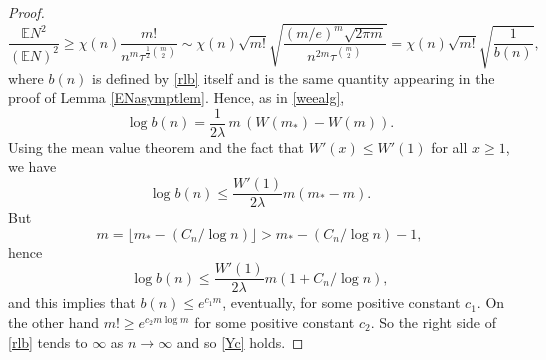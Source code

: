 \documentclass[reqno]{amsart}
\def\red{\color{red}}
\theoremstyle{theorem}
\theoremstyle{definition}
\theoremstyle{remark}
\newtheorem{remark}[theorem]{\bf\em Remark}
\def\E{\mathbb{E}}
\newcommand{\1}{{\text{\Large $\mathfrak 1$}}}	%
\newcommand{\var}{\operatorname{var}}
\numberwithin{equation}{section}
\def\Y{\mathbb{Y}}
\begin{document}
\begin{proof}
\begin{equation}
\frac{\E N^2}{(\E N)^2}  \ge \chi(n) \frac{m!}{n^m \tau^{\frac12\binom{m}{2}}}
\sim 
\chi(n) \sqrt{m!} \sqrt{\frac{(m/e)^m \sqrt{2\pi m}}{n^{2m}\tau^{\binom{m}{2}}}}
= \chi(n) \sqrt{m!} 
\sqrt{\frac{1}{b(n)}},
\end{equation}
where $b(n)$ is defined by \eqref{rlb} itself and is the same quantity
appearing in the proof of Lemma \ref{ENasymptlem}.
Hence, as in \eqref{weealg},
\[
\log b(n) = \frac{1}{2\lambda} \, m\, ( W(m_*) - W(m) ).
\]
Using the mean value theorem and the fact that $W'(x) \le W'(1)$ for
all $x \ge 1$, we have
\[
\log b(n) \le \frac{W'(1)}{2\lambda} m (m_*-m).
\]
But 
\[
m=\lfloor m_*-(C_n/\log n)\rfloor > m_*-(C_n/\log n)-1,
\]
hence
\[
\log b(n) \le \frac{W'(1)}{2\lambda} m(1+C_n/\log n),
\]
and this implies that $b(n) \le e^{c_1 m}$, eventually,
for some positive constant $c_1$. On the other hand 
$m! \ge e^{c_2 m \log m}$ for some positive constant $c_2$.
So the right side of \eqref{rlb} tends to $\infty$ as $n \to \infty$
and so \eqref{Yc} holds.
\end{proof}

\end{document}

